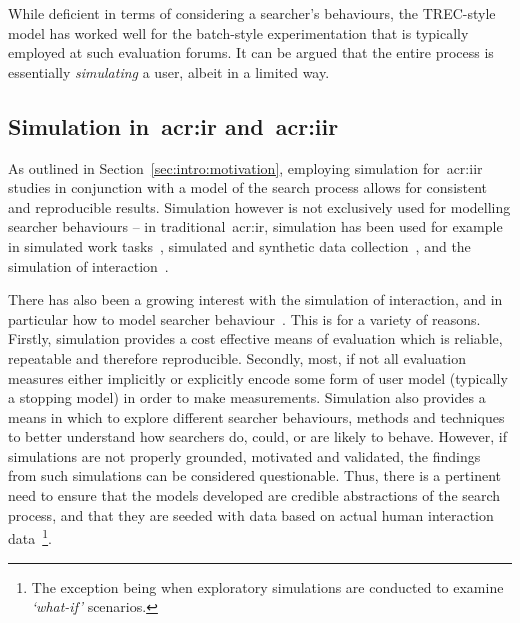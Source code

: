 While deficient in terms of considering a searcher's behaviours, the TREC-style model has worked well for the batch-style experimentation that is typically employed at such evaluation forums. It can be argued that the entire process is essentially \emph{simulating} a user, albeit in a limited way.

\subsection{Simulation in~\gls{acr:ir} and~\gls{acr:iir}}\label{sec:ir_background:user:simulation}
As outlined in Section~\ref{sec:intro:motivation}, employing simulation for~\gls{acr:iir} studies in conjunction with a model of the search process allows for consistent and reproducible results. Simulation however is not exclusively used for modelling searcher behaviours -- in traditional~\gls{acr:ir}, simulation has been used for example in simulated work tasks~\citep{borlund2003iir_model, voorhees2005trec_book}, simulated and synthetic data collection~\citep{azzopardi2009query_side, azzopardi2007languages, jordan2006cqg, tague1980simulation_bibliographic}, and the simulation of interaction~\citep{azzopardi2010workshop, carterette2011effectiveness_evaluation, clarke2013mube,  leuski2000relevance_reinforcement, white2004simulated_feedback_models}.

There has also been a growing interest with the simulation of interaction, and in particular how to model searcher behaviour~\citep{azzopardi2010workshop, clarke2013mube}. This is for a variety of reasons. Firstly, simulation provides a cost effective means of evaluation which is reliable, repeatable and therefore reproducible. Secondly, most, if not all evaluation measures either implicitly or explicitly encode some form of user model (typically a stopping model) in order to make measurements. Simulation also provides a means in which to explore different searcher behaviours, methods and techniques to better understand how searchers do, could, or are likely to behave. However, if simulations are not properly grounded, motivated and validated, the findings from such simulations can be considered questionable. Thus, there is a pertinent need to ensure that the models developed are credible abstractions of the search process, and that they are seeded with data based on actual human interaction data~\citep{azzopardi2010workshop}\footnote{\scriptsize{The exception being when exploratory simulations are conducted to examine \emph{`what-if'} scenarios.}}. 


